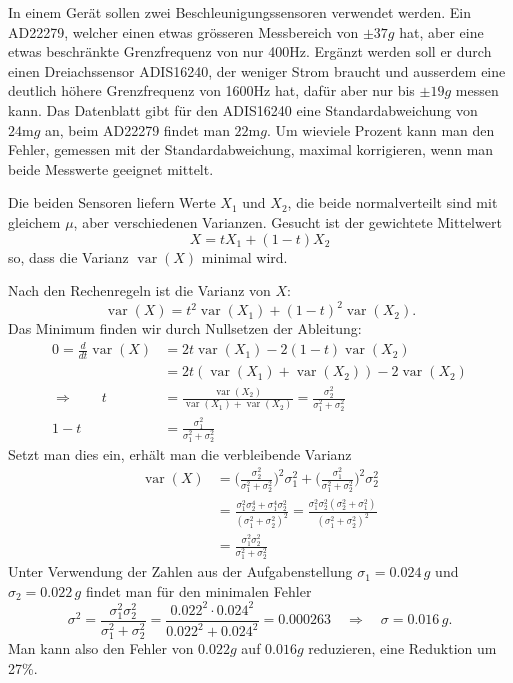 In einem Gerät sollen zwei Beschleunigungssensoren verwendet
werden. Ein AD22279, welcher einen etwas grösseren Messbereich von
$\pm37g$ hat, aber eine etwas beschränkte Grenzfrequenz von nur 400Hz.
Ergänzt werden soll er durch einen Dreiachssensor ADIS16240,
der weniger Strom braucht und ausserdem eine deutlich höhere
Grenzfrequenz von 1600Hz hat, dafür aber nur bis $\pm19g$ messen kann.
Das Datenblatt gibt für den ADIS16240 eine Standardabweichung von
$24\text{m}g$ an, beim AD22279 findet man $22\text{m}g$.
Um wieviele Prozent kann man den Fehler, gemessen mit
der Standardabweichung, maximal korrigieren, wenn man beide
Messwerte geeignet mittelt.


\begin{loesung}
Die beiden Sensoren liefern Werte $X_1$ und $X_2$, die
beide normalverteilt sind mit gleichem $\mu$, aber verschiedenen
Varianzen. Gesucht ist der gewichtete Mittelwert
\[
X=tX_1+(1-t)X_2
\]
so, dass die Varianz $\operatorname{var}(X)$ minimal wird.

Nach den Rechenregeln ist die Varianz von $X$:
\[
\operatorname{var}(X)=t^2\operatorname{var}(X_1)+(1-t)^2\operatorname{var}(X_2).
\]
Das Minimum finden wir durch Nullsetzen der Ableitung:
\begin{align*}
0=\frac{d}{dt}\operatorname{var}(X)
&=
2t\operatorname{var}(X_1)-2(1-t)\operatorname{var}(X_2)
\\
&=
2t(\operatorname{var}(X_1)+\operatorname{var}(X_2)) -2\operatorname{var}(X_2)
\\
\Rightarrow\qquad
t&=\frac{\operatorname{var}(X_2)}{\operatorname{var}(X_1)+\operatorname{var}(X_2)}
=\frac{\sigma_2^2}{\sigma_1^2+\sigma_2^2}
\\
1-t&=
\frac{\sigma_1^2}{\sigma_1^2+\sigma_2^2}
\end{align*}
Setzt man dies ein, erhält man die verbleibende Varianz
\begin{align*}
\operatorname{var}(X)
&=
\biggl(
\frac{\sigma_2^2}{\sigma_1^2+\sigma_2^2}
\biggr)^2
\sigma_1^2
+
\biggl(
\frac{\sigma_1^2}{\sigma_1^2+\sigma_2^2}
\biggr)^2
\sigma_2^2
\\
&=\frac{\sigma_1^2\sigma_2^4+\sigma_1^4\sigma_2^2}{(\sigma_1^2+\sigma_2^2)^2}
=\frac{\sigma_1^2\sigma_2^2(\sigma_2^2+\sigma_1^2)}{(\sigma_1^2+\sigma_2^2)^2}
\\
&=
\frac{\sigma_1^2\sigma_2^2}{\sigma_1^2+\sigma_2^2}
\end{align*}
Unter Verwendung der Zahlen aus der Aufgabenstellung
$\sigma_1=0.024\,g$ und $\sigma_2=0.022\,g$ findet man für
den minimalen Fehler
\[
\sigma^2
=
\frac{\sigma_1^2\sigma_2^2}{\sigma_1^2+\sigma_2^2}=\frac{0.022^2\cdot 0.024^2}{0.022^2+0.024^2}=0.000263
\quad\Rightarrow\quad
\sigma
=0.016\,g.
\]
Man kann also den Fehler von $0.022g$ auf
$0.016g$ reduzieren, eine Reduktion um 27\%.
\end{loesung}


